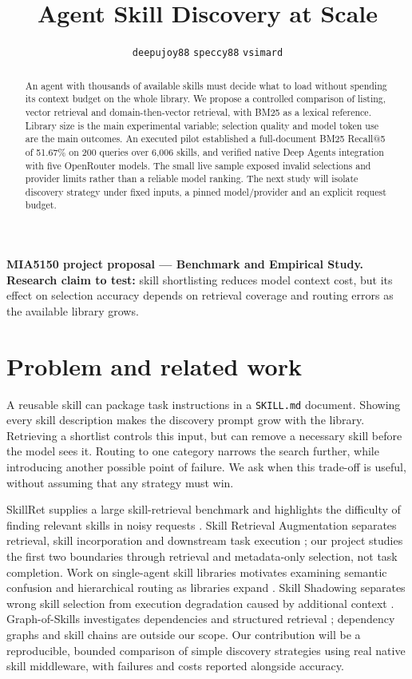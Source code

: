 \documentclass{article}
\title{Agent Skill Discovery at Scale}
\author{\texttt{deepujoy88} \And \texttt{speccy88} \And \texttt{vsimard}}
\begin{document}
\maketitle

\begin{abstract}
An agent with thousands of available skills must decide what to load without
spending its context budget on the whole library. We propose a controlled
comparison of listing, vector retrieval and domain-then-vector retrieval, with
BM25 as a lexical reference. Library size is the main experimental variable;
selection quality and model token use are the main outcomes. An executed pilot
established a full-document BM25 Recall@5 of 51.67\% on 200 queries over 6,006
skills, and verified native Deep Agents integration with five OpenRouter models.
The small live sample exposed invalid selections and provider limits rather than
a reliable model ranking. The next study will isolate discovery strategy under
fixed inputs, a pinned model/provider and an explicit request budget.
\end{abstract}

\noindent\textbf{MIA5150 project proposal --- Benchmark and Empirical Study.}
\textbf{Research claim to test:} skill shortlisting reduces model context cost,
but its effect on selection accuracy depends on retrieval coverage and routing
errors as the available library grows.

\section{Problem and related work}
A reusable skill can package task instructions in a \texttt{SKILL.md} document.
Showing every skill description makes the discovery prompt grow with the library.
Retrieving a shortlist controls this input, but can remove a necessary skill
before the model sees it. Routing to one category narrows the search further,
while introducing another possible point of failure. We ask when this trade-off
is useful, without assuming that any strategy must win.

SkillRet supplies a large skill-retrieval benchmark and highlights the difficulty
of finding relevant skills in noisy requests \citep{kang2026skillret}. Skill
Retrieval Augmentation separates retrieval, skill incorporation and downstream
task execution \citep{su2026skill}; our project studies the first two boundaries
through retrieval and metadata-only selection, not task completion.
Work on single-agent skill libraries motivates examining semantic confusion and
hierarchical routing as libraries expand \citep{li2026single}. Skill Shadowing
separates wrong skill selection from execution degradation caused by additional
context \citep{song2026shadowing}. Graph-of-Skills investigates dependencies and
structured retrieval \citep{liu2026graph}; dependency graphs and skill chains are
outside our scope. Our contribution will be a reproducible, bounded comparison
of simple discovery strategies using real native skill middleware, with failures
and costs reported alongside accuracy.
\end{document}
